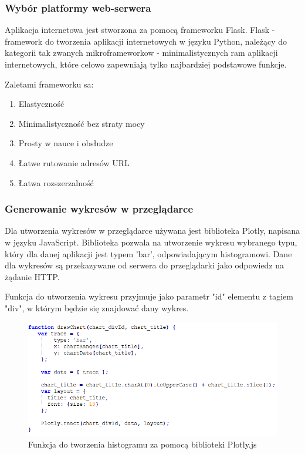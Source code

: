 \documentclass[a4paper]{article}
\begin{document}
        \subsubsection{Wybór platformy web-serwera}
        Aplikacja internetowa jest stworzona za pomocą frameworku Flask. Flask - framework do tworzenia aplikacji internetowych w języku Python, należący do kategorii tak zwanych mikroframeworkow - minimalistycznych ram aplikacji internetowych, które celowo zapewniają tylko najbardziej podstawowe funkcje.
        
        Zaletami frameworku sa:
        \begin{enumerate}
            \item Elastyczność
            \item Minimalistyczność bez straty mocy
            \item Prosty w nauce i obsłudze
            \item Łatwe rutowanie adresów URL
            \item Łatwa rozszerzalność
        \end{enumerate}
    
    \subsubsection{Generowanie wykresów w przeglądarce}
    
        Dla utworzenia wykresów w przeglądarce używana jest biblioteka Plotly, napisana w języku JavaScript. Biblioteka pozwala na utworzenie wykresu wybranego typu, który dla danej aplikacji jest typem 'bar', odpowiadającym histogramowi. Dane dla wykresów są przekazywane od serwera do przeglądarki jako odpowiedz na żądanie HTTP.
        
        Funkcja do utworzenia wykresu przyjmuje jako parametr "id" elementu z tagiem "div", w którym będzie się znajdować dany wykres.
        
        \begin{figure}[H]
            \centering
            \includegraphics{images/plotlyExample.png}
            \caption{Funkcja do tworzenia histogramu za pomocą biblioteki Plotly.js}
        \end{figure}
        
\end{document}
